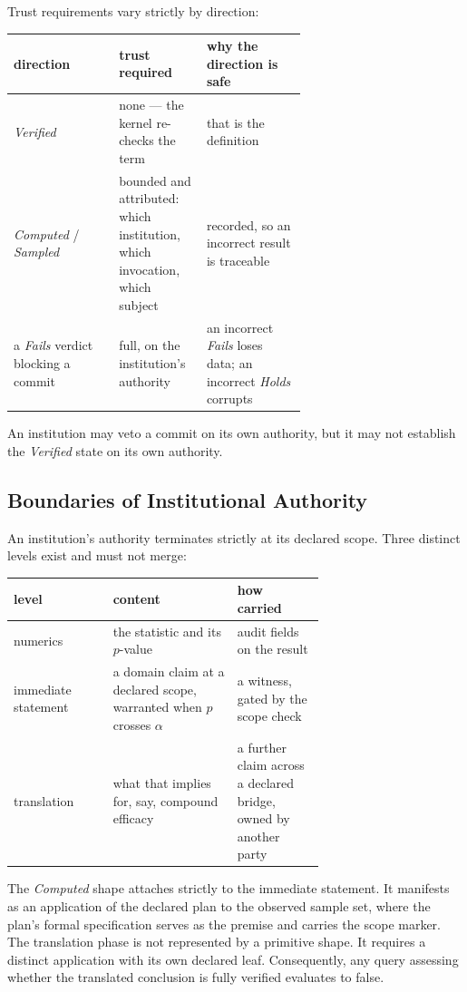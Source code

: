 \documentclass[manuscript,nonacm=true]{acmart}
\begin{document}
Trust requirements vary strictly by direction:

\begin{table}[h]
\small
\begin{tabular}{@{}lp{0.30\linewidth}p{0.34\linewidth}@{}}
\toprule
\textbf{direction} & \textbf{trust required} & \textbf{why the direction is safe} \\
\midrule
\emph{Verified} & none --- the kernel re-checks the term & that is the definition \\
\emph{Computed} / \emph{Sampled} & bounded and attributed: which institution, which invocation, which subject & recorded, so an incorrect result is traceable \\
a \emph{Fails} verdict blocking a commit & full, on the institution's authority & an incorrect \emph{Fails} loses data; an incorrect \emph{Holds} corrupts \\
\bottomrule
\end{tabular}
\end{table}

An institution may veto a commit on its own authority, but it may not establish the \emph{Verified} state on its own authority.

\subsection{Boundaries of Institutional Authority}

An institution's authority terminates strictly at its declared scope. Three distinct levels exist and must not merge:

\begin{table}[h]
\small
\begin{tabular}{@{}lp{0.40\linewidth}p{0.28\linewidth}@{}}
\toprule
\textbf{level} & \textbf{content} & \textbf{how carried} \\
\midrule
numerics & the statistic and its $p$-value & audit fields on the result \\
immediate statement & a domain claim at a declared scope, warranted when $p$ crosses $\alpha$ & a witness, gated by the scope check \\
translation & what that implies for, say, compound efficacy & a further claim across a declared bridge, owned by another party \\
\bottomrule
\end{tabular}
\end{table}

The \emph{Computed} shape attaches strictly to the immediate statement. It manifests as an application of the declared plan to the observed sample set, where the plan's formal specification serves as the premise and carries the scope marker. The translation phase is not represented by a primitive shape. It requires a distinct application with its own declared leaf. Consequently, any query assessing whether the translated conclusion is fully verified evaluates to false.
\end{document}
